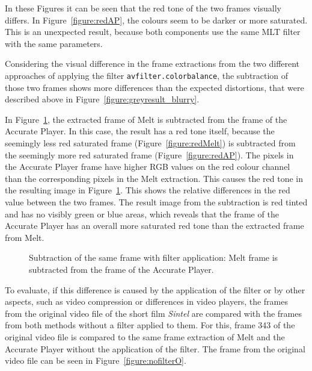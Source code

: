 \documentclass[../MasterThesis.tex]{subfiles}
\begin{document}
\vspace*{1.5em}
In these Figures it can be seen that the red tone of the two frames visually differs. In Figure~\ref{figure:redAP}, the colours seem to be darker or more saturated. This is an unexpected result, because both components use the same MLT filter with the same parameters.


Considering the visual difference in the frame extractions from the two different approaches of applying the filter \texttt{avfilter.colorbalance}, the subtraction of those two frames shows more differences than the expected distortions, that were described above in Figure~\ref{figure:greyresult_blurry}.

In Figure~\ref{figure:filterVSfilter}, the extracted frame of Melt is subtracted from the frame of the Accurate Player.
In this case, the result has a red tone itself, because the seemingly less red saturated frame (Figure~\ref{figure:redMelt}) is subtracted from the seemingly more red saturated frame (Figure~\ref{figure:redAP}). The pixels in the Accurate Player frame have higher RGB values on the red colour channel than the corresponding pixels in the Melt extraction. This causes the red tone in the resulting image in Figure~\ref{figure:filterVSfilter}.
This shows the relative differences in the red value between the two frames. 
The result image from the subtraction is red tinted and has no visibly green or blue areas, which reveals that the frame of the Accurate Player has an overall more saturated red tone than the extracted frame from Melt.


\begin{figure}[H]
	\begin{center}
		\caption[Subtraction of the two different frames (Accurate Player - Melt).]{Subtraction of the same frame with filter application:  Melt frame is subtracted from the frame of the Accurate Player.}
		\label{figure:filterVSfilter}
	\end{center}
\end{figure}

To evaluate, if this difference is caused by the application of the filter or by other aspects, such as video compression or differences in video players, the frames from the original video file of the short film \textit{Sintel} are compared with the frames from both methods without a filter applied to them. For this, frame 343 of the original video file is compared to the same frame extraction of Melt and the Accurate Player without the application of the filter. The frame from the original video file can be seen in Figure~\ref{figure:nofilterO}.
\end{document}
